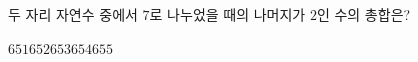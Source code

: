 두 자리 자연수 중에서 $7$로 나누었을 때의 나머지가 $2$인 수의 총합은?
\begin{choices32}{$651$}{$652$}{$653$}{$654$}{$655$}\end{choices32}
